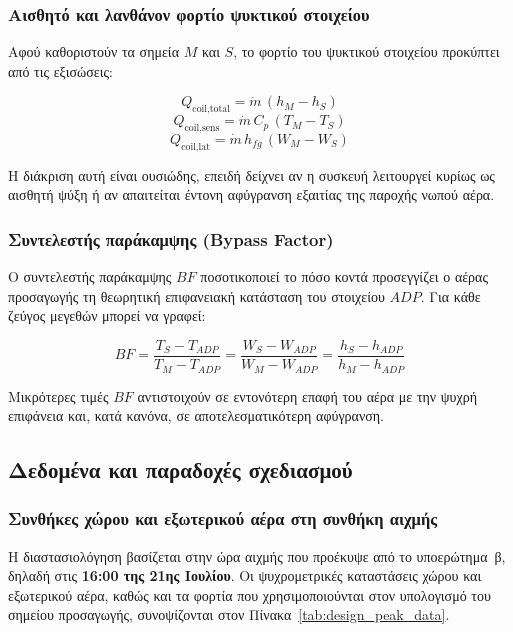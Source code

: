 \documentclass[12pt,a4paper]{article}
\begin{document}
\subsubsection{Αισθητό και λανθάνον φορτίο ψυκτικού στοιχείου}

Αφού καθοριστούν τα σημεία \(M\) και \(S\), το φορτίο του ψυκτικού στοιχείου
προκύπτει από τις εξισώσεις:

\[
Q_{\text{coil,total}} = \dot m \, (h_M - h_S)
\]
\[
Q_{\text{coil,sens}} = \dot m \, C_p \, (T_M - T_S)
\]
\[
Q_{\text{coil,lat}} = \dot m \, h_{fg} \, (W_M - W_S)
\]

Η διάκριση αυτή είναι ουσιώδης, επειδή δείχνει αν η συσκευή λειτουργεί κυρίως ως
αισθητή ψύξη ή αν απαιτείται έντονη αφύγρανση εξαιτίας της παροχής νωπού αέρα.

\subsubsection{Συντελεστής παράκαμψης (\texorpdfstring{\textenglish{Bypass Factor}}{Bypass Factor})}

Ο συντελεστής παράκαμψης \(BF\) ποσοτικοποιεί το πόσο κοντά προσεγγίζει ο αέρας
προσαγωγής τη θεωρητική επιφανειακή κατάσταση του στοιχείου \(ADP\). Για κάθε
ζεύγος μεγεθών μπορεί να γραφεί:

\[
BF = \frac{T_S - T_{ADP}}{T_M - T_{ADP}}
= \frac{W_S - W_{ADP}}{W_M - W_{ADP}}
= \frac{h_S - h_{ADP}}{h_M - h_{ADP}}
\]

Μικρότερες τιμές \(BF\) αντιστοιχούν σε εντονότερη επαφή του αέρα με την ψυχρή
επιφάνεια και, κατά κανόνα, σε αποτελεσματικότερη αφύγρανση.

\subsection{Δεδομένα και παραδοχές σχεδιασμού}

\subsubsection{Συνθήκες χώρου και εξωτερικού αέρα στη συνθήκη αιχμής}

Η διαστασιολόγηση βασίζεται στην ώρα αιχμής που προέκυψε από το υποερώτημα~β,
δηλαδή στις \textbf{16:00 της 21ης Ιουλίου}. Οι ψυχρομετρικές καταστάσεις χώρου
και εξωτερικού αέρα, καθώς και τα φορτία που χρησιμοποιούνται στον υπολογισμό του
σημείου προσαγωγής, συνοψίζονται στον Πίνακα~\ref{tab:design_peak_data}.
\end{document}

